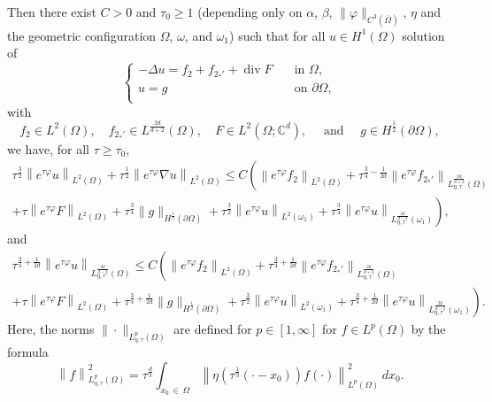 \documentclass[AHL,Unicode,longabstracts]{cedram}
\newcommand*\C{\mathbb{C}}
\renewcommand{\leq}{\leqslant}
\renewcommand{\geq}{\geqslant}
\renewcommand{\div}{\operatorname{div}}
\begin{document}
\begin{theo}
Then there exist $C>0$ and $\tau_0 \geq 1$ (depending only on $\alpha$, $\beta$, $\| \varphi \|_{C^3(\overline\Omega)}$, $\eta$ and the geometric configuration $\Omega$, $\omega$, and $\omega_1$) such that for all $u \in H^1(\Omega)$ solution of
\begin{equation} \label{Elliptic-Eq-general}
\begin{cases}
- \Delta u = f_2 + f_{2_*'} + \div F \quad &\text{in } \Omega,\\
u=g \quad &\text{on } \partial \Omega,\\
\end{cases}
\end{equation}
with
\begin{equation*}\label{Reg-Source-Terms}
f_2 \in L^2(\Omega),
\quad f_{2_*'} \in L^{ \frac{2d}{d+2}}(\Omega),
\quad F \in L^2(\Omega; \C^{d}),
\quad\text{ and } \quad g \in H^{\frac{1}{2}}(\partial\Omega),
\end{equation*}
we have, for all $\tau \geq \tau_0$,
\begin{multline}\label{Carleman-General-1}
\tau^{\frac{3}{2}} \left\| e^{\tau \varphi} u \right\|_{L^2(\Omega)} +
\tau^{\frac{1}{2}} \left\| e^{\tau \varphi} \nabla u \right\|_{L^2(\Omega)}
\leq C \left(
\left\| e^{\tau \varphi} f_2 \right\|_{L^2(\Omega)} +
\tau^{\frac{3}{4}-\frac{1}{2d}} \left\| e^{\tau \varphi} f_{2_*'} \right\|_{L^{\frac{2d}{d+2}}_{\eta,\tau} (\Omega)}
\right.
\\
\left. +
\tau \left\| e^{\tau \varphi} F \right\|_{L^2(\Omega)} +
\tau^{\frac{3}{4}} \|g \|_{H^{\frac{1}{2}}(\partial \Omega)} +
\tau^{\frac{3}{2}} \left\| e^{\tau \varphi} u\right\|_{L^2(\omega_1)} +
\tau^{\frac{3}{4}} \left\| e^{\tau \varphi} u \right\|_{L^{\frac{2d}{d-2}}_{\eta,\tau} (\omega_1)}
\right),
\end{multline}
and
\begin{multline}\label{Carleman-General-2}
\tau^{\frac{3}{4}+\frac{1}{2d}} \left\| e^{\tau \varphi} u \right\|_{L^{\frac{2d}{d-2}}_{\eta,\tau} (\Omega)}
\leq C \left(
\left\| e^{\tau \varphi} f_2 \right\|_{L^2(\Omega)} +
\tau^{\frac{3}{4}+\frac{1}{2d}} \left\| e^{\tau \varphi} f_{2_*'} \right\|_{L^{\frac{2d}{d+2}}_{\eta,\tau} (\Omega)}
\right.
\\
\left. +
\tau \left\| e^{\tau \varphi} F \right\|_{L^2(\Omega)} +
\tau^{\frac{3}{4}+\frac{1}{2d}} \|g \|_{H^{\frac{1}{2}}(\partial \Omega)} +
\tau^{\frac{3}{2}} \left\| e^{\tau \varphi} u\right\|_{L^2(\omega_1)} +
\tau^{\frac{3}{4}+\frac{1}{2d}} \left\| e^{\tau \varphi} u \right\|_{L^{\frac{2d}{d-2}}_{\eta,\tau} (\omega_1)}
\right).
\end{multline}
Here, the norms $\| \cdot \|_{L^p_{\eta, \tau}(\Omega)}$ are defined for $p \in [1, \infty]$ for $f \in L^p(\Omega)$ by the formula
\begin{equation}\label{Def-L-p-eta-Omega}
\left\| f\right\|_{L^p_{\eta, \tau}(\Omega)}^2 =
\tau^{\frac{d}{3}} \int_{x_0\,\in\,\Omega} \left\| \eta\left(\tau^{\frac{1}{3}} (\cdot -x_0)\right) f(\cdot) \right\|_{L^p(\Omega)}^2 \, dx_0.
\end{equation}
\end{theo}
\end{document}
